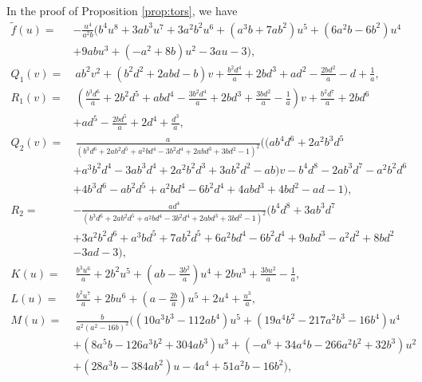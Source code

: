 \documentclass{gtpart}
\theoremstyle{definition}
\theoremstyle{remark}
\newcommand{\Tf}{\widetilde{f}}
\begin{document}
In the proof of Proposition \ref{prop:tors}, we have 
\begin{equation*}
\begin{split}
 \Tf(u) = & -\frac{u^4}{a^2 b} \big( b^4 u^8 + 3 a b^3 u^7 + 3 a^2 b^2 u^6 + (a^3 b + 7 a b^2) u^5 + (6 a^2 b - 6 b^2) u^4 \qquad~~ \\
          & + 9 a b u^3 + (-a^2 + 8 b) u^2 - 3 a u - 3 \big), \\
 Q_1(v) = & ~ a b^2 v^2 + (b^2 d^2 + 2 a b d - b) v + \frac{b^2 d^4}{a} + 2 b d^3 + a d^2 - \frac{2 b d^2}{a} - d + \frac{1}{a}, 
\end{split}
\end{equation*}
\begin{equation*}
\begin{split}
 R_1(v) = & ~ (\frac{b^3 d^6}{a} + 2 b^2 d^5 + a b d^4 - \frac{3 b^2 d^4}{a} + 2 b d^3 + \frac{3 b d^2}{a} - \frac{1}{a}) v + \frac{b^2 d^7}{a} + 2 b d^6 \\
          & + a d^5 - \frac{2 b d^5}{a} + 2 d^4 + \frac{d^3}{a}, \\
 Q_2(v) = & ~ \frac{a}{(b^3 d^6 + 2 a b^2 d^5 + a^2 b d^4 - 3 b^2 d^4 + 2 a b d^3 + 3 b d^2 - 1)^2} \big( (a b^4 d^6 + 2 a^2 b^3 d^5 \\
          & + a^3 b^2 d^4 - 3 a b^3 d^4 + 2 a^2 b^2 d^3 + 3 a b^2 d^2 - a b) v - b^4 d^8 - 2 a b^3 d^7 - a^2 b^2 d^6 \\
          & + 4 b^3 d^6 - a b^2 d^5 + a^2 b d^4 - 6 b^2 d^4 + 4 a b d^3 + 4 b d^2 - a d - 1 \big), \\
 R_2 = & - \frac{a d^4}{(b^3 d^6 + 2 a b^2 d^5 + a^2 b d^4 - 3 b^2 d^4 + 2 a b d^3 + 3 b d^2 - 1)^2} (b^4 d^8 + 3 a b^3 d^7 \\
       & + 3 a^2 b^2 d^6 + a^3 b d^5 + 7 a b^2 d^5 + 6 a^2 b d^4 - 6 b^2 d^4 + 9 a b d^3 - a^2 d^2 + 8 b d^2 \\
       & - 3 a d - 3), \\
 K(u) = & ~ \frac{b^3 u^6}{a} + 2 b^2 u^5 + (a b - \frac{3 b^2}{a}) u^4 + 2 b u^3 + \frac{3 b u^2}{a} - \frac{1}{a}, \\
 L(u) = & ~ \frac{b^2 u^7}{a} + 2 b u^6 + (a - \frac{2 b}{a}) u^5 + 2 u^4 + \frac{u^3}{a}, \\
 M(u) = & ~ \frac{b}{a^2 (a^2 - 16 b)^2} \big( (10 a^3 b^3 - 112 a b^4) u^5 + (19 a^4 b^2 - 217 a^2 b^3 - 16 b^4) u^4 \\
        & + (8 a^5 b - 126 a^3 b^2 + 304 a b^3) u^3 + (-a^6 + 34 a^4 b -266 a^2 b^2 +32 b^3) u^2 \\
        & + (28 a^3 b - 384 a b^2) u - 4 a^4 + 51 a^2 b - 16 b^2 \big), \\

\end{split}
\end{equation*}
\end{document}
